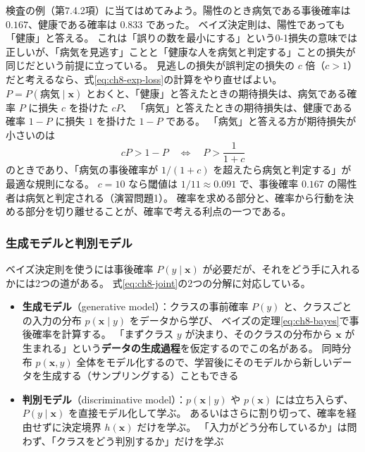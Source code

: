 検査の例（第7.4.2項）に当てはめてみよう。陽性のとき病気である事後確率は $0.167$、健康である確率は $0.833$ であった。
ベイズ決定則は、陽性であっても「健康」と答える。
これは「誤りの数を最小にする」という0-1損失の意味では正しいが、「病気を見逃す」ことと「健康な人を病気と判定する」ことの損失が同じだという前提に立っている。
見逃しの損失が誤判定の損失の $c$ 倍（$c > 1$）だと考えるなら、式\eqref{eq:ch8-exp-loss}の計算をやり直せばよい。
$P = P(\text{病気} \mid \bm{x})$ とおくと、「健康」と答えたときの期待損失は、病気である確率 $P$ に損失 $c$ を掛けた $cP$、
「病気」と答えたときの期待損失は、健康である確率 $1 - P$ に損失 $1$ を掛けた $1 - P$ である。
「病気」と答える方が期待損失が小さいのは
\begin{equation}
  cP > 1 - P
  \quad\Longleftrightarrow\quad
  P > \frac{1}{1 + c}
  \label{eq:ch8-asym-threshold}
\end{equation}
のときであり、「病気の事後確率が $1/(1 + c)$ を超えたら病気と判定する」が最適な規則になる。
$c = 10$ なら閾値は $1/11 \approx 0.091$ で、事後確率 $0.167$ の陽性者は病気と判定される（演習問題1）。
確率を求める部分と、確率から行動を決める部分を切り離せることが、確率で考える利点の一つである。

\subsubsection{生成モデルと判別モデル}

ベイズ決定則を使うには事後確率 $P(y \mid \bm{x})$ が必要だが、それをどう手に入れるかには2つの道がある。
式\eqref{eq:ch8-joint}の2つの分解に対応している。

\begin{itemize}
  \item \textbf{生成モデル}（generative model）：クラスの事前確率 $P(y)$ と、クラスごとの入力の分布 $p(\bm{x} \mid y)$ をデータから学び、
    ベイズの定理\eqref{eq:ch8-bayes}で事後確率を計算する。
    「まずクラス $y$ が決まり、そのクラスの分布から $\bm{x}$ が生まれる」という\textbf{データの生成過程}を仮定するのでこの名がある。
    同時分布 $p(\bm{x}, y)$ 全体をモデル化するので、学習後にそのモデルから新しいデータを生成する（サンプリングする）こともできる
  \item \textbf{判別モデル}（discriminative model）：$p(\bm{x} \mid y)$ や $p(\bm{x})$ には立ち入らず、$P(y \mid \bm{x})$ を直接モデル化して学ぶ。
    あるいはさらに割り切って、確率を経由せずに決定境界 $h(\bm{x})$ だけを学ぶ。
    「入力がどう分布しているか」は問わず、「クラスをどう判別するか」だけを学ぶ
\end{itemize}

